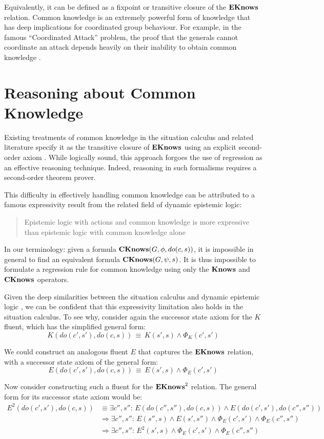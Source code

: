 Equivalently, it can be defined as a fixpoint or transitive closure
of the $\mathbf{EKnows}$ relation. Common knowledge is an extremely powerful
form of knowledge that has deep implications for coordinated group
behaviour. For example, in the famous {}``Coordinated Attack'' problem,
the proof that the generals cannot coordinate an attack depends heavily
on their inability to obtain common knowledge \citep{halpern90knowledge_distrib}.


\section{Reasoning about Common Knowledge}

Existing treatments of common knowledge in the situation calculus
and related literature specify it as the transitive closure of $\mathbf{EKnows}$
using an explicit second-order axiom \citep{davis05fo_ma_theory,ghaderi07sc_joint_ability}.
While logically sound, this approach forgoes the use of regression
as an effective reasoning technique. Indeed, reasoning in such formalisms
requires a second-order theorem prover.

This difficulty in effectively handling common knowledge can be attributed
to a famous expressivity result from the related field of dynamic
epistemic logic:

\begin{quote}
Epistemic logic with actions and common knowledge is more expressive
than epistemic logic with common knowledge alone \citep{baltag98pa_ck} 
\end{quote}
In our terminology: given a formula $\mathbf{CKnows}(G,\phi,do(c,s))$, it
is impossible in general to find an equivalent formula $\mathbf{CKnows}(G,\psi,s)$.
It is thus impossible to formulate a regression rule for common knowledge
using only the $\mathbf{Knows}$ and $\mathbf{CKnows}$ operators.

Given the deep similarities between the situation calculus and dynamic
epistemic logic \citep{vanbentham07ml_sitcalc}, we can be confident
that this expressivity limitation also holds in the situation calculus.
To see why, consider again the successor state axiom for the $K$
fluent, which has the simplified general form:\[
K(do(c',s'),do(c,s))\,\equiv\, K(s',s)\wedge\Phi_{K}(c',s')\]


We could construct an analogous fluent $E$ that captures the $\mathbf{EKnows}$
relation, with a successor state axiom of the general form:\[
E(do(c',s'),do(c,s))\,\equiv\, E(s',s)\wedge\Phi_{E}(c',s')\]


Now consider constructing such a fluent for the $\mathbf{EKnows}^{2}$ relation.
The general form for its successor state axiom would be:\begin{align*}
E^{2}(do(c',s'),do(c,s)) & \equiv\exists c'',s'':\, E(do(c'',s''),do(c,s))\wedge E(do(c',s'),do(c'',s''))\\
 & \Rightarrow\exists c'',s'':\, E(s'',s)\wedge E(s',s'')\wedge\Phi_{E}(c',s')\wedge\Phi_{E}(c'',s'')\\
 & \Rightarrow\exists c'',s'':\, E^{2}(s',s)\wedge\Phi_{E}(c',s')\wedge\Phi_{E}(c'',s'')\end{align*}


